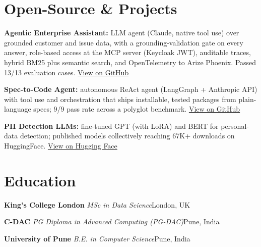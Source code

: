\documentclass[10pt,a4paper]{article}
\newcommand{\sep}{\,\textcolor{accent!60}{\textbar}\,}
\begin{document}
\section{Open-Source \& Projects}
\begin{tight}
  \item \textbf{Agentic Enterprise Assistant:} LLM agent (Claude, native tool use) over grounded customer and issue data, with a grounding-validation gate on every answer, role-based access at the MCP server (Keycloak JWT), auditable traces, hybrid BM25 plus semantic search, and OpenTelemetry to Arize Phoenix. Passed 13/13 evaluation cases. \href{https://github.com/abhijeetscode/Agentic-Enterprise-Assistant}{View on GitHub}
  \item \textbf{Spec-to-Code Agent:} autonomous ReAct agent (LangGraph + Anthropic API) with tool use and orchestration that ships installable, tested packages from plain-language specs; 9/9 pass rate across a polyglot benchmark. \href{https://github.com/abhijeetscode/Spec-to-Code-Agent}{View on GitHub}
  \item \textbf{PII Detection LLMs:} fine-tuned GPT (with LoRA) and BERT for personal-data detection; published models collectively reaching 67K+ downloads on HuggingFace. \href{https://huggingface.co/ab-ai/pii_model}{View on Hugging Face}
\end{tight}

\section{Education}
{\color{company}\bfseries King's College London}\sep{\itshape MSc in Data Science}\hfill {\color{muted}London, UK}\par\vspace{1pt}
{\color{company}\bfseries C-DAC}\sep{\itshape PG Diploma in Advanced Computing (PG-DAC)}\hfill {\color{muted}Pune, India}\par\vspace{1pt}
{\color{company}\bfseries University of Pune}\sep{\itshape B.E. in Computer Science}\hfill {\color{muted}Pune, India}\par
\end{document}
